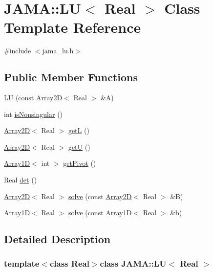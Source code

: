 \hypertarget{classJAMA_1_1LU}{\section{J\-A\-M\-A\-:\-:L\-U$<$ Real $>$ Class Template Reference}
\label{classJAMA_1_1LU}
}


{\ttfamily \#include $<$jama\-\_\-lu.\-h$>$}

\subsection*{Public Member Functions}
\begin{DoxyCompactItemize}
\item 
\hyperlink{classJAMA_1_1LU_af280c292fc2801a6fa5e5c0a84f15685}{L\-U} (const \hyperlink{classTNT_1_1Array2D}{Array2\-D}$<$ Real $>$ \&A)
\item 
int \hyperlink{classJAMA_1_1LU_afc7269c15f48fbbefdcb067bf71cc179}{is\-Nonsingular} ()
\item 
\hyperlink{classTNT_1_1Array2D}{Array2\-D}$<$ Real $>$ \hyperlink{classJAMA_1_1LU_a34b9bc8eef3f7771de20176b807bf977}{get\-L} ()
\item 
\hyperlink{classTNT_1_1Array2D}{Array2\-D}$<$ Real $>$ \hyperlink{classJAMA_1_1LU_ad2148238b7e2c6a2db01985cb66f8f72}{get\-U} ()
\item 
\hyperlink{classTNT_1_1Array1D}{Array1\-D}$<$ int $>$ \hyperlink{classJAMA_1_1LU_a94dba52c7036cb779427106e65d85f1d}{get\-Pivot} ()
\item 
Real \hyperlink{classJAMA_1_1LU_a954d514e3e802da2fc8a422d15df5cfd}{det} ()
\item 
\hyperlink{classTNT_1_1Array2D}{Array2\-D}$<$ Real $>$ \hyperlink{classJAMA_1_1LU_abf011e4d8405ec35412a7fc06bd7c9a8}{solve} (const \hyperlink{classTNT_1_1Array2D}{Array2\-D}$<$ Real $>$ \&B)
\item 
\hyperlink{classTNT_1_1Array1D}{Array1\-D}$<$ Real $>$ \hyperlink{classJAMA_1_1LU_abe62763addfd25c019f09b5420198d33}{solve} (const \hyperlink{classTNT_1_1Array1D}{Array1\-D}$<$ Real $>$ \&b)
\end{DoxyCompactItemize}


\subsection{Detailed Description}
\subsubsection*{template$<$class Real$>$class J\-A\-M\-A\-::\-L\-U$<$ Real $>$}

